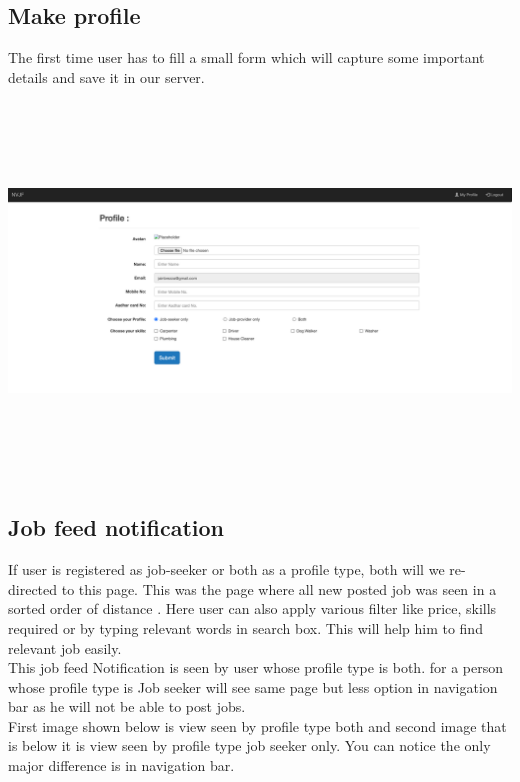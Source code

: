 \documentclass[a4paper 12pt]{article}
\begin{document}
\subsection{Make profile}
The first time user has to fill a small form which will capture some important details and save it in our server.
\begin{center}
\includegraphics[width=15cm, height=10cm]{makeprofile.png}
\end{center}




\subsection{Job feed notification}
If user is registered as job-seeker or both as a profile type, both will we re-directed to this page.
This was the page where all new posted job was seen in a sorted order of distance . Here user can also apply various filter like price, skills required or by typing relevant words in search box. This will help him to find relevant job easily.\\

This job feed Notification is seen by user whose profile type is both. for a person whose profile type is Job seeker will see same page but less option in navigation bar as he will not be able to post jobs.\\

First image shown below is view seen by profile type both and second image that is below it is view seen by profile type job seeker only. You can notice the only major difference is in navigation bar.\\
\end{document}
